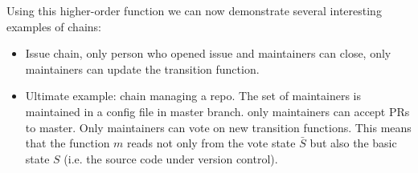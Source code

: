 Using this higher-order function we can now demonstrate several interesting
examples of chains:
\begin{itemize}
\item Issue chain, only person who opened issue and maintainers can close, only
  maintainers can update the transition function.
\item Ultimate example: chain managing a repo. The set of maintainers is
  maintained in a config file in master branch. only maintainers can accept PRs
  to master. Only maintainers can vote on new transition functions. This means
  that the function $m$ reads not only from the vote state $\bar S$ but also the
  basic state $S$ (i.e. the source code under version control).
\end{itemize}
